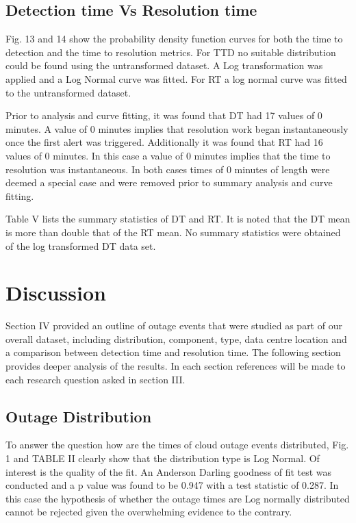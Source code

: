 \documentclass[conference]{IEEEtran}
\begin{document}
\subsection{Detection time Vs Resolution time}

Fig. 13 and 14 show the probability density function curves for both the time to detection and the time to resolution metrics. For TTD no suitable distribution could be found using the untransformed dataset. A Log transformation was applied and a Log Normal curve was fitted. For RT a log normal curve was fitted to the untransformed dataset. 

Prior to analysis and curve fitting, it was found that DT had 17 values of 0 minutes. A value of 0 minutes implies that resolution work began instantaneously once the first alert was triggered. Additionally it was found that RT had 16 values of 0 minutes. In this case a value of 0 minutes implies that the time to resolution was instantaneous. In both cases times of 0 minutes of length were deemed a special case and were removed prior to summary analysis and curve fitting.

Table V lists the summary statistics of DT and RT. It is noted that the DT mean is more than double that of the RT mean. No summary statistics were obtained of the log transformed DT data set.

\section{Discussion}

Section IV provided an outline of outage events that were studied as part of our overall dataset, including distribution, component, type, data centre location and a comparison between detection time  and resolution time. The following section provides deeper analysis of the results. In each section references will be made to each research question asked in section III.

\subsection{Outage Distribution}

To answer the question how are the times of cloud outage events distributed, Fig. 1 and TABLE II clearly show that the distribution type is Log Normal. Of interest is the quality of the fit. An Anderson Darling goodness of fit test was conducted and a p value was found to be 0.947 with a test statistic of 0.287. In this case the hypothesis of whether the outage times are Log normally distributed cannot be rejected given the overwhelming evidence to the contrary.  \par
\end{document}
